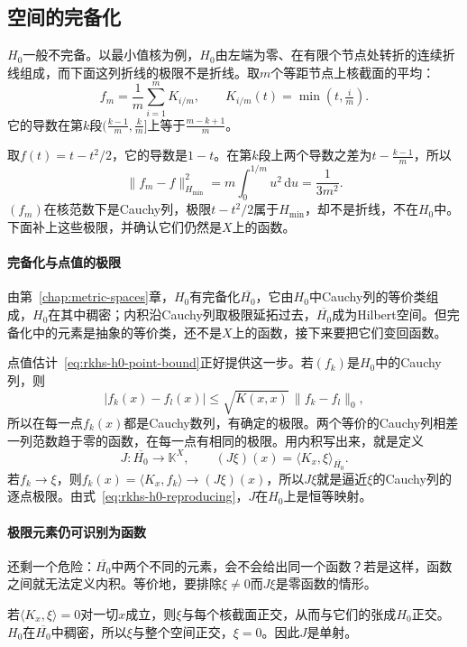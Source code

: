 \subsection{空间的完备化}
\label{sec:rkhs-completion}

$H_0$一般不完备。以最小值核为例，$H_0$由左端为零、在有限个节点处转折的连续折线组成，而下面这列折线的极限不是折线。取$m$个等距节点上核截面的平均：
\[
f_m=\frac1m\sum_{i=1}^mK_{i/m},\qquad K_{i/m}(t)=\min(t,\tfrac im).
\]
它的导数在第$k$段$(\tfrac{k-1}m,\tfrac km]$上等于$\tfrac{m-k+1}m$。

取$f(t)=t-t^2/2$，它的导数是$1-t$。在第$k$段上两个导数之差为$t-\tfrac{k-1}m$，所以
\[
\lVert f_m-f\rVert_{H_{\min}}^2=m\int_0^{1/m}u^2\,\mathrm du=\frac1{3m^2}.
\]
$(f_m)$在核范数下是Cauchy列，极限$t-t^2/2$属于$H_{\min}$，却不是折线，不在$H_0$中。下面补上这些极限，并确认它们仍然是$X$上的函数。

\paragraph{完备化与点值的极限}

由第~\ref{chap:metric-spaces}章，$H_0$有完备化$\overline{H_0}$，它由$H_0$中Cauchy列的等价类组成，$H_0$在其中稠密；内积沿Cauchy列取极限延拓过去，$\overline{H_0}$成为Hilbert空间。但完备化中的元素是抽象的等价类，还不是$X$上的函数，接下来要把它们变回函数。

点值估计~\eqref{eq:rkhs-h0-point-bound}正好提供这一步。若$(f_k)$是$H_0$中的Cauchy列，则
\[
\lvert f_k(x)-f_l(x)\rvert\leq\sqrt{K(x,x)}\,\lVert f_k-f_l\rVert_0 ,
\]
所以在每一点$f_k(x)$都是Cauchy数列，有确定的极限。两个等价的Cauchy列相差一列范数趋于零的函数，在每一点有相同的极限。用内积写出来，就是定义
\[
J:\overline{H_0}\to\mathbb K^X,\qquad (J\xi)(x)=\langle K_x,\xi\rangle_{\overline{H_0}} .
\]
若$f_k\to\xi$，则$f_k(x)=\langle K_x,f_k\rangle\to(J\xi)(x)$，所以$J\xi$就是逼近$\xi$的Cauchy列的逐点极限。由式~\eqref{eq:rkhs-h0-reproducing}，$J$在$H_0$上是恒等映射。

\paragraph{极限元素仍可识别为函数}

还剩一个危险：$\overline{H_0}$中两个不同的元素，会不会给出同一个函数？若是这样，函数之间就无法定义内积。等价地，要排除$\xi\neq0$而$J\xi$是零函数的情形。

若$\langle K_x,\xi\rangle=0$对一切$x$成立，则$\xi$与每个核截面正交，从而与它们的张成$H_0$正交。$H_0$在$\overline{H_0}$中稠密，所以$\xi$与整个空间正交，$\xi=0$。因此$J$是单射。

